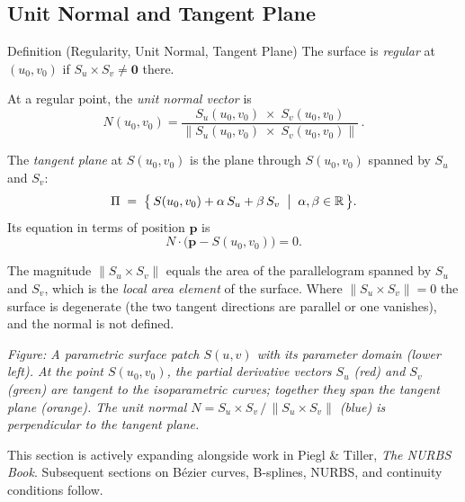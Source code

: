 \subsection*{Unit Normal and Tangent Plane}

\begin{propositionbox}{Definition (Regularity, Unit Normal, Tangent Plane)}
The surface is \emph{regular} at $(u_0,v_0)$ if
$S_u \times S_v \neq \mathbf{0}$ there.

At a regular point, the \emph{unit normal vector} is
\[
  N(u_0,v_0)
  = \frac{S_u(u_0,v_0)\;\times\; S_v(u_0,v_0)}
         {\|S_u(u_0,v_0)\;\times\; S_v(u_0,v_0)\|}\,.
\]

The \emph{tangent plane} at $S(u_0,v_0)$ is the plane through
$S(u_0,v_0)$ spanned by $S_u$ and $S_v$:
\[
  \Pi\;=\;\bigl\{\,S(u_0,v_0) + \alpha\,S_u + \beta\,S_v
               \;\bigm|\; \alpha,\beta\in\mathbb{R}\,\bigr\}.
\]
Its equation in terms of position $\mathbf{p}$ is
\[
  N\cdot\bigl(\mathbf{p} - S(u_0,v_0)\bigr) = 0.
\]
\end{propositionbox}

\begin{remark*}
The magnitude $\|S_u \times S_v\|$ equals the area of the
parallelogram spanned by $S_u$ and $S_v$, which is the
\emph{local area element} of the surface.
Where $\|S_u \times S_v\| = 0$ the surface is degenerate
(the two tangent directions are parallel or one vanishes),
and the normal is not defined.
\end{remark*}

\vspace{1em}
\begin{center}

\end{center}

\begin{center}
\small\itshape
Figure: A parametric surface patch $S(u,v)$ with its parameter domain (lower left).
At the point $S(u_0,v_0)$, the partial derivative vectors $S_u$ (red) and $S_v$ (green)
are tangent to the isoparametric curves; together they span the tangent plane (orange).
The unit normal $N = S_u \times S_v\,/\,\|S_u \times S_v\|$ (blue) is perpendicular
to the tangent plane.
\end{center}

\vspace{1em}
\begin{tcolorbox}[
  colback=gray!6, colframe=gray!40, arc=2pt,
  left=8pt, right=8pt, top=6pt, bottom=6pt,
  title={\small\textbf{Status: Active}},
  fonttitle=\small\bfseries
]
\noindent This section is actively expanding alongside work in Piegl \& Tiller,
\textit{The NURBS Book}.
Subsequent sections on B\'{e}zier curves, B-splines, NURBS, and continuity
conditions follow.
\end{tcolorbox}
